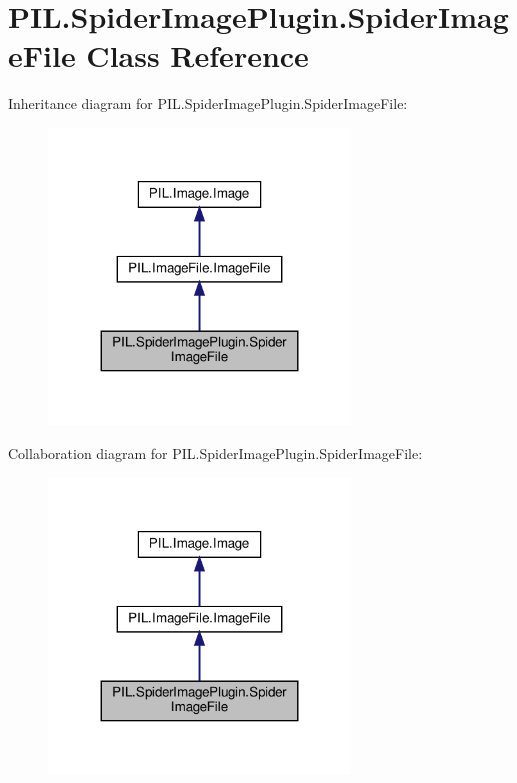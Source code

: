 \hypertarget{classPIL_1_1SpiderImagePlugin_1_1SpiderImageFile}{}\section{P\+I\+L.\+Spider\+Image\+Plugin.\+Spider\+Image\+File Class Reference}
\label{classPIL_1_1SpiderImagePlugin_1_1SpiderImageFile}


Inheritance diagram for P\+I\+L.\+Spider\+Image\+Plugin.\+Spider\+Image\+File\+:
\nopagebreak
\begin{figure}[H]
\begin{center}
\leavevmode
\includegraphics[width=227pt]{classPIL_1_1SpiderImagePlugin_1_1SpiderImageFile__inherit__graph}
\end{center}
\end{figure}


Collaboration diagram for P\+I\+L.\+Spider\+Image\+Plugin.\+Spider\+Image\+File\+:
\nopagebreak
\begin{figure}[H]
\begin{center}
\leavevmode
\includegraphics[width=227pt]{classPIL_1_1SpiderImagePlugin_1_1SpiderImageFile__coll__graph}
\end{center}
\end{figure}
